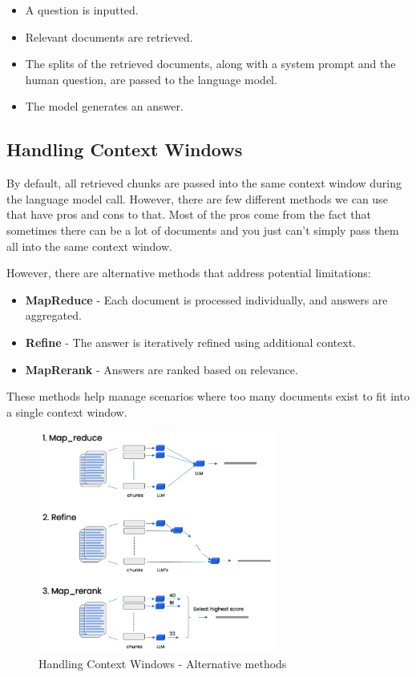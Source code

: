 \documentclass{article}
\begin{document}
\begin{itemize}
    \item A question is inputted.
    \item Relevant documents are retrieved.
    \item The splits of the retrieved documents, along with a system prompt and the human question, are passed to the language model.
    \item The model generates an answer.
\end{itemize}

\subsection{Handling Context Windows}

By default, all retrieved chunks are passed into the same context window during the language model call. However, there are few different methods we can use that have pros and cons to that. Most of the pros come from the fact that sometimes there can be a lot of documents and you just can't simply pass them all into the same context window.

However, there are alternative methods that address potential limitations:

\begin{itemize}
    \item \textbf{MapReduce} - Each document is processed individually, and answers are aggregated.
    \item \textbf{Refine} - The answer is iteratively refined using additional context.
    \item \textbf{MapRerank} - Answers are ranked based on relevance.
\end{itemize}

These methods help manage scenarios where too many documents exist to fit into a single context window.

\begin{figure}[H]
    \centering
    \includegraphics[width=0.7\textwidth]{images/langchain_chat_with_your_data_019.png}
    \caption{Handling Context Windows - Alternative methods}
    \label{fig:handling_context_windows_alternative_methods}
\end{figure}
\end{document}
